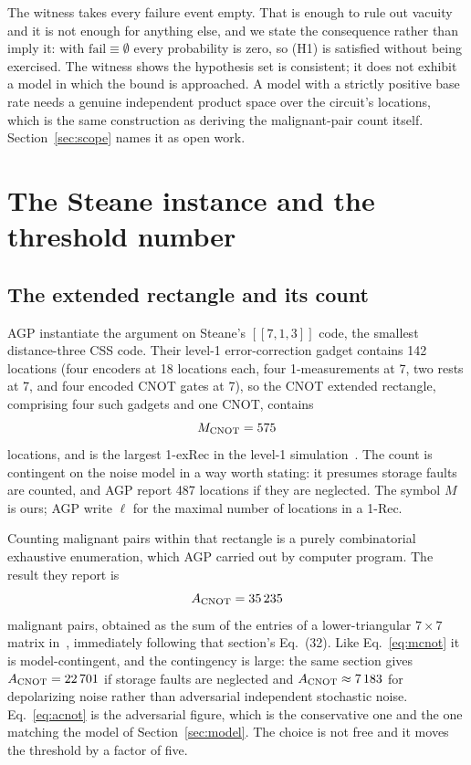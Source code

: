 \documentclass[aps,prx,reprint,nofootinbib,superscriptaddress]{revtex4-2}
\begin{document}
The witness takes every failure event empty. That is enough to rule out
vacuity and it is not enough for anything else, and we state the consequence
rather than imply it: with $\mathrm{fail} \equiv \emptyset$ every probability is
zero, so (H1) is satisfied without being exercised. The witness shows the
hypothesis set is consistent; it does not exhibit a model in which the bound is
approached. A model with a strictly positive base rate needs a genuine
independent product space over the circuit's locations, which is the same
construction as deriving the malignant-pair count itself.
Section~\ref{sec:scope} names it as open work.

\section{The Steane instance and the threshold number}
\label{sec:steane}

\subsection{The extended rectangle and its count}

AGP instantiate the argument on Steane's $[[7,1,3]]$ code, the smallest
distance-three CSS code. Their level-1 error-correction gadget contains 142
locations (four encoders at 18 locations each, four 1-measurements at 7, two
rests at 7, and four encoded CNOT gates at 7), so the CNOT extended rectangle,
comprising four such gadgets and one CNOT, contains
\begin{equation}
  M_{\rm CNOT} = 575
  \label{eq:mcnot}
\end{equation}
locations, and is the largest 1-exRec in the level-1 simulation~\cite[\S8.3]{AGP2006}.
The count is contingent on the noise model in a way worth stating: it presumes
storage faults are counted, and AGP report 487 locations if they are neglected.
The symbol $M$ is ours; AGP write $\ell$ for the maximal number of locations in a
1-Rec.

Counting malignant pairs within that rectangle is a purely combinatorial
exhaustive enumeration, which AGP carried out by computer program. The result
they report is
\begin{equation}
  A_{\rm CNOT} = 35\,235
  \label{eq:acnot}
\end{equation}
malignant pairs, obtained as the sum of the entries of a lower-triangular
$7 \times 7$ matrix in~\cite[\S8.3]{AGP2006}, immediately following that
section's Eq.~(32). Like Eq.~\eqref{eq:mcnot} it is model-contingent, and the
contingency is large: the same section gives $A_{\rm CNOT} = 22\,701$ if storage
faults are neglected and $A_{\rm CNOT} \approx 7\,183$ for depolarizing noise
rather than adversarial independent stochastic noise. Eq.~\eqref{eq:acnot} is
the adversarial figure, which is the conservative one and the one matching the
model of Section~\ref{sec:model}. The choice is not free and it moves the
threshold by a factor of five.
\end{document}
